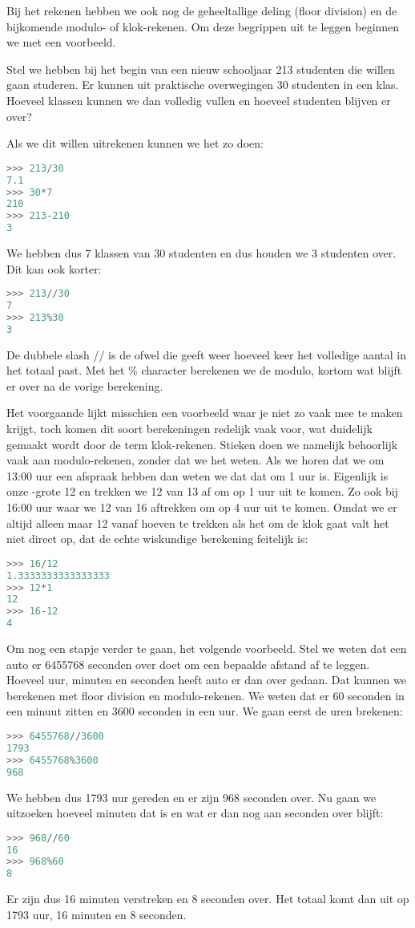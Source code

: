 Bij het rekenen hebben we ook nog de geheeltallige deling (floor division) en de bijkomende modulo- of klok-rekenen. Om deze begrippen uit te leggen beginnen we met een voorbeeld.

Stel we hebben bij het begin van een nieuw schooljaar 213 studenten die willen gaan studeren. Er kunnen uit praktische overwegingen 30 studenten in een klas. Hoeveel klassen kunnen we dan volledig vullen en hoeveel studenten blijven er over?

Als we dit willen uitrekenen kunnen we het zo doen:
\begin{lstlisting}[language=Python]
>>> 213/30
7.1
>>> 30*7
210
>>> 213-210
3
\end{lstlisting}
We hebben dus 7 klassen van 30 studenten en dus houden we 3 studenten over. Dit kan ook korter:
\begin{lstlisting}[language=Python]
>>> 213//30
7
>>> 213%30
3
\end{lstlisting}
De dubbele slash // is de  ofwel die geeft weer hoeveel keer het volledige aantal in het totaal past. Met het \% character berekenen we de modulo, kortom wat blijft er over na de vorige berekening.

Het voorgaande lijkt misschien een voorbeeld waar je niet zo vaak mee te maken krijgt, toch komen dit soort berekeningen redelijk vaak voor, wat duidelijk gemaakt wordt door de term klok-rekenen. Stieken doen we namelijk behoorlijk vaak aan modulo-rekenen, zonder dat we het weten. Als we horen dat we om 13:00 uur een afspraak hebben dan weten we dat dat om 1 uur is. Eigenlijk is onze -grote 12 en trekken we 12 van 13 af om op 1 uur uit te komen. Zo ook bij 16:00 uur waar we 12 van 16 aftrekken om op 4 uur uit te komen. Omdat we er altijd alleen maar 12 vanaf hoeven te trekken als het om de klok gaat valt het niet direct op, dat de echte wiskundige berekening feitelijk is:
\begin{lstlisting}[language=Python]
>>> 16/12
1.3333333333333333
>>> 12*1
12
>>> 16-12
4
\end{lstlisting}

Om nog een stapje verder te gaan, het volgende voorbeeld. Stel we weten dat een auto er 6455768 seconden over doet om een bepaalde afstand af te leggen. Hoeveel uur, minuten en seconden heeft auto er dan over gedaan. Dat kunnen we berekenen met floor division en modulo-rekenen. We weten dat er 60 seconden in een minuut zitten en 3600 seconden in een uur. We gaan eerst de uren brekenen:
\begin{lstlisting}[language=Python]
>>> 6455768//3600
1793
>>> 6455768%3600
968
\end{lstlisting}
We hebben dus 1793 uur gereden en er zijn 968 seconden over. Nu gaan we uitzoeken hoeveel minuten dat is en wat er dan nog aan seconden over blijft:
\begin{lstlisting}[language=Python]
>>> 968//60
16
>>> 968%60
8
\end{lstlisting}
Er zijn dus 16 minuten verstreken en 8 seconden over. Het totaal komt dan uit op 1793 uur, 16 minuten en 8 seconden.


